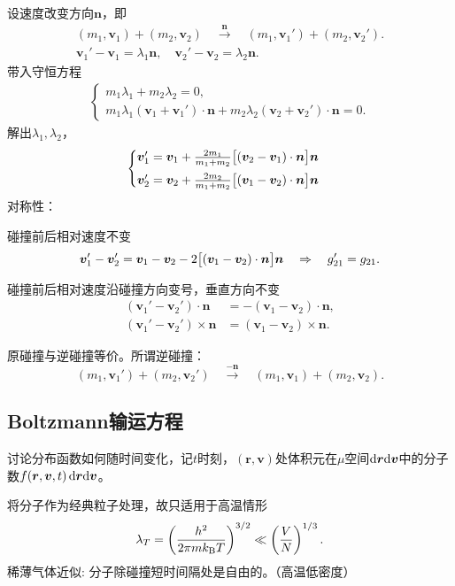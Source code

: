 设速度改变方向$\bm n$，即
\begin{gather*}
	(m_1,\bm v_1)+(m_2,\bm v_2)\quad\overset{\bm n}{\longrightarrow}\quad(m_1,\bm v_1')+(m_2,\bm v_2').\\
	\bm v_1'-\bm v_1=\lambda_1\bm n,\quad\bm v_2'-\bm v_2=\lambda_2\bm n.
\end{gather*}
带入守恒方程
\begin{align*}
	\begin{cases}
		m_1\lambda_1+m_2\lambda_2=0,\\
		m_1\lambda_1(\bm v_1+\bm v_1')\cdot\bm n+m_2\lambda_2(\bm v_2+\bm v_2')\cdot\bm n=0.
	\end{cases}
\end{align*}
解出$\lambda_1,\lambda_2$，
\begin{align}
	\begin{cases}
		\bm v_1'=\bm v_1+\frac{2m_1}{m_1+m_2}\bigl[(\bm v_2-\bm v_1)\cdot\bm n\bigr]\bm n\\[1ex]
		\bm v_2'=\bm v_2+\frac{2m_2}{m_1+m_2}\bigl[(\bm v_1-\bm v_2)\cdot\bm n\bigr]\bm n
	\end{cases}
\end{align}
对称性：
\begin{compactenum}
	\item 碰撞前后相对速度不变
	\[
		\bm v_1'-\bm v_2'=\bm v_1-\bm v_2-2\bigl[(\bm v_1-\bm v_2)\cdot\bm n\bigr]\bm n\quad\Rightarrow\quad g_{21}'=g_{21}.
	\]
	\item 碰撞前后相对速度沿碰撞方向变号，垂直方向不变
	\begin{align*}
		(\bm v_1'-\bm v_2')\cdot\bm n&=-(\bm v_1-\bm v_2)\cdot\bm n,\\
		(\bm v_1'-\bm v_2')\times\bm n&=(\bm v_1-\bm v_2)\times\bm n.
	\end{align*}
	\item 原碰撞与逆碰撞等价。所谓逆碰撞：
	\[
		(m_1,\bm v_1')+(m_2,\bm v_2')\quad\overset{-\bm n}{\longrightarrow}\quad(m_1,\bm v_1)+(m_2,\bm v_2).
	\]
\end{compactenum}
\subsection{Boltzmann输运方程}
讨论分布函数如何随时间变化，记$t$时刻，$(\bm r,\bm v)$处体积元在$\mu$空间$\mathop{}\!\mathrm{d}\bm r\mathrm{d}\bm v$中的分子数$f(\bm r,\bm v,t)\mathop{}\!\mathrm{d}\bm r\mathrm{d}\bm v$。

将分子作为经典粒子处理，故只适用于高温情形
\[
	\lambda_T=\left(\frac{h^2}{2\pi mk_{\mathrm B} T}\right)^{3/2}\ll\left(\frac VN\right)^{1/3}.
\]
稀薄气体近似: 分子除碰撞短时间隔处是自由的。（高温低密度）

